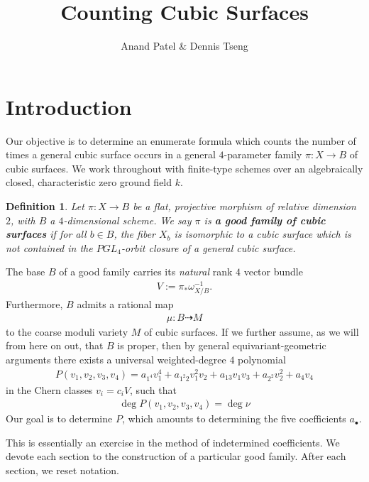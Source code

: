 \documentclass[12 pt]{amsart}
\title{Counting Cubic Surfaces}
\author{Anand Patel \& Dennis Tseng}
\newtheorem{definition}{Definition}[section]
\newcommand{\<}{\left\langle}
\renewcommand{\>}{\right\rangle}
\begin{document}
\maketitle


\section{Introduction}
\label{sec:intro}
Our objective is to determine an enumerate formula which counts the
number of times a general cubic surface occurs in a general
$4$-parameter family $ \pi: X \to B$ of cubic surfaces.  We work
throughout with finite-type schemes over an algebraically closed,
characteristic zero ground field $k$.


\begin{definition}
  Let $\pi :X \to B$ be a flat, projective morphism of relative
  dimension $2$, with $B$ a $4$-dimensional scheme. We say $\pi$ is
  {\bf a good family of cubic surfaces} if for all $b \in B$, the
  fiber $X_{b}$ is isomorphic to a cubic surface which is not
  contained in the $PGL_4$-orbit closure of a general cubic surface.
\end{definition}

The base $B$ of a good family carries its {\sl natural} rank $4$
vector bundle
\begin{align}
  \label{eq:V}
  V := \pi_{*}\omega_{X/B}^{-1}.
\end{align}
Furthermore, $B$ admits a rational map
\begin{align}
  \label{eq:mu}
  \mu: B \dashrightarrow M
\end{align}
to the coarse moduli variety $M$ of cubic surfaces. If we further
assume, as we will from here on out, that $B$ is proper, then by
general equivariant-geometric arguments there exists a universal
weighted-degree $4$ polynomial
\begin{align}
  \label{eq:P}
  P(v_1,v_2,v_3,v_4) = a_{1^4}v_{1}^{4} + a_{1^{2}2}v_{1}^{2}v_{2} + a_{13}v_{1}v_{3} + a_{2^2}v_{2}^{2} + a_{4}v_{4}
\end{align}
in the Chern classes $v_{i} = c_{i}V$, such that
\begin{align}
  \label{eq:equality}
  \deg P(v_{1},v_{2},v_{3},v_{4}) = \deg \nu
  \end{align}
Our goal is to determine $P$, which amounts to determining
the five coefficients $a_{\bullet}$.

This is essentially an exercise in the method of indetermined
coefficients. We devote each section to the construction of a
particular good family.  After each section, we reset notation.
\end{document}
